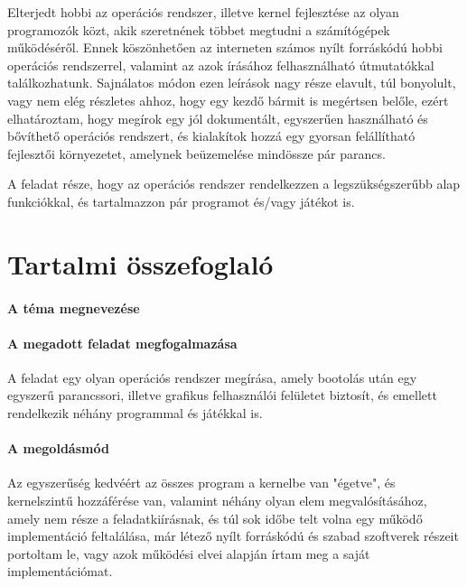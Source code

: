 \documentclass[12pt,numbers=noenddot]{report}
\begin{document}
Elterjedt hobbi az operációs rendszer, illetve kernel fejlesztése az olyan
programozók közt, akik szeretnének többet megtudni a számítógépek működéséről.
Ennek köszönhetően az interneten számos nyílt forráskódú hobbi operációs
rendszerrel, valamint az azok írásához felhasználható útmutatókkal
találkozhatunk. Sajnálatos módon ezen leírások nagy része elavult, túl
bonyolult, vagy nem elég részletes ahhoz, hogy egy kezdő bármit is megértsen
belőle, ezért elhatároztam, hogy megírok egy jól dokumentált, egyszerűen
használható és bővíthető operációs rendszert, és kialakítok hozzá egy gyorsan
felállítható fejlesztői környezetet, amelynek beüzemelése mindössze pár parancs.

\hfill \break
A feladat része, hogy az operációs rendszer rendelkezzen a legszükségszerűbb
alap funkciókkal, és tartalmazzon pár programot és/vagy játékot is.


\chapter*{Tartalmi összefoglaló}

\subsubsection*{A téma megnevezése}

\cim

\subsubsection*{A megadott feladat megfogalmazása}

A feladat egy olyan operációs rendszer megírása, amely bootolás után egy
egyszerű parancssori, illetve grafikus felhasználói felületet biztosít, és
emellett rendelkezik néhány programmal és játékkal is.

\subsubsection*{A megoldásmód}

Az egyszerűség kedvéért az összes program a kernelbe van "égetve", és
kernelszintű hozzáférése van, valamint néhány olyan elem megvalósításához,
amely nem része a feladatkiírásnak, és túl sok időbe telt volna egy működő
implementáció feltalálása, már létező nyílt forráskódú és szabad szoftverek
részeit portoltam le, vagy azok működési elvei alapján írtam meg a saját
implementációmat.
\end{document}
